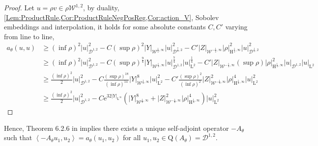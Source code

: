 \documentclass{article}
\def\W{\mathcal W}
\def\L{\mathrm L}
\def\H{\mathrm H}
\def\Q{\mathrm Q}
\newtheorem{lemme}[theo]{Lemma}
\theoremstyle{definition}
\numberwithin{equation}{section}
\newcommand{\e}{\mathrm{e}} %
\begin{document}

\begin{proof}

    Let $u=\rho v\in\rho\W^{1,2}$, by duality, \cref{Lem:ProductRule,Cor:ProductRuleNegPosReg,Cor:action_V}, Sobolev embeddings and interpolation, it holds for some absolute constants $C,C'$ varying from line to line,
    \begin{align*}
        a_\theta(u,u)&\geqslant (\inf \rho)^2|u|_{\mathcal{D}^{1,2}}^2 - C(\sup \rho)^2|Y|_{\W^{\frac{1}{4},\infty}}|u|_{\mathcal{D}^{\frac{7}{8},2}}^2 - C'|Z|_{\W^{-\frac{1}{4},\infty}}|\rho|_{\H^{\frac{1}{4},\infty}}^2|u|_{\mathcal{D}^{\frac{1}{2},2}}^2\\
        &\geqslant (\inf \rho)^2|u|_{\mathcal{D}^{1,2}}^2 - C(\sup \rho)^{\frac{9}{4}}|Y|_{\W^{\frac{1}{4},\infty}}|u|_{\mathcal{D}^{1,2}}^{\frac{7}{4}}|u|_{\L^2}^{\frac{1}{4}} - C'|Z|_{\W^{-\frac{1}{4},\infty}}(\sup\rho)|\rho|_{\H^{\frac{1}{4},\infty}}^2|u|_{\mathcal{D}^{1,2}}|u|_{\L^2}\\
        &\geqslant \frac{(\inf \rho)^2}{2}|u|_{\mathcal{D}^{1,2}}^2 - C\frac{(\sup \rho)^{18}}{(\inf \rho)^{14}}|Y|_{\W^{\frac{1}{4},\infty}}^{8}|u|_{\L^2}^2 - C'\frac{(\sup\rho)^2}{(\inf \rho)^2}|Z|_{\W^{-\frac{1}{4},\infty}}^2|\rho|_{\H^{\frac{1}{4},\infty}}^4|u|_{\L^2}^2\\
        &\geqslant \frac{(\inf \rho)^2}{2}|u|_{\mathcal{D}^{1,2}}^2- C\e^{32|Y|_{\L^\infty}}\left(|Y|_{\W^{\frac{1}{4},\infty}}^{8}+|Z|_{\W^{-\frac{1}{4},\infty}}^2|\rho|_{\H^{\frac{1}{4},\infty}}^4\right)|u|_{\L^2}^2
    \end{align*}
    
\end{proof}

Hence, Theorem 6.2.6 in \cite{KatoPerturbationBook} implies there exists a unique self-adjoint operator $-A_\theta$ such that $\left\langle-A_\theta u_1,u_2\right\rangle = a_\theta(u_1,u_2)$ for all $u_1,u_2\in\Q\left(A_\theta\right)=\mathcal{D}^{1,2}$.
\end{document}
